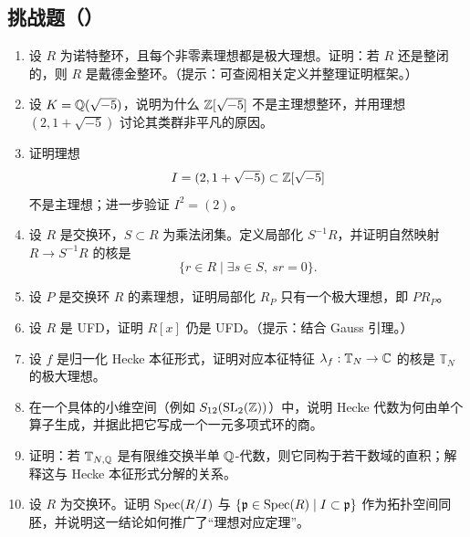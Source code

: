 \subsection*{挑战题（\hard）}

\begin{enumerate}[label=\textbf{9.\arabic*}, leftmargin=*, resume]
  \item \hard 设 $R$ 为诺特整环，且每个非零素理想都是极大理想。证明：若 $R$ 还是整闭的，则 $R$ 是戴德金整环。（提示：可查阅相关定义并整理证明框架。）
  \item \hard 设 $K=\mathbb{Q}(\sqrt{-5})$，说明为什么 $\mathbb{Z}[\sqrt{-5}]$ 不是主理想整环，并用理想 $(2,1+\sqrt{-5})$ 讨论其类群非平凡的原因。
  \item \hard 证明理想
  \[
  I=(2,1+\sqrt{-5})\subset \mathbb{Z}[\sqrt{-5}]
  \]
  不是主理想；进一步验证 $I^2=(2)$。
  \item \hard 设 $R$ 是交换环，$S\subset R$ 为乘法闭集。定义局部化 $S^{-1}R$，并证明自然映射 $R\to S^{-1}R$ 的核是
  \[
  \{r\in R\mid \exists s\in S,\ sr=0\}.
  \]
  \item \hard 设 $P$ 是交换环 $R$ 的素理想，证明局部化 $R_P$ 只有一个极大理想，即 $PR_P$。
  \item \hard 设 $R$ 是 UFD，证明 $R[x]$ 仍是 UFD。（提示：结合 Gauss 引理。）
  \item \hard 设 $f$ 是归一化 Hecke 本征形式，证明对应本征特征 $\lambda_f:\mathbb{T}_N\to \mathbb{C}$ 的核是 $\mathbb{T}_N$ 的极大理想。
  \item \hard 在一个具体的小维空间（例如 $S_{12}(\mathrm{SL}_2(\mathbb{Z}))$）中，说明 Hecke 代数为何由单个算子生成，并据此把它写成一个一元多项式环的商。
  \item \hard 证明：若 $\mathbb{T}_{N,\mathbb{Q}}$ 是有限维交换半单 $\mathbb{Q}$-代数，则它同构于若干数域的直积；解释这与 Hecke 本征形式分解的关系。
  \item \hard 设 $R$ 为交换环。证明 $\mathrm{Spec}(R/I)$ 与 $\{\mathfrak p\in \mathrm{Spec}(R)\mid I\subset \mathfrak p\}$ 作为拓扑空间同胚，并说明这一结论如何推广了“理想对应定理”。
\end{enumerate}
